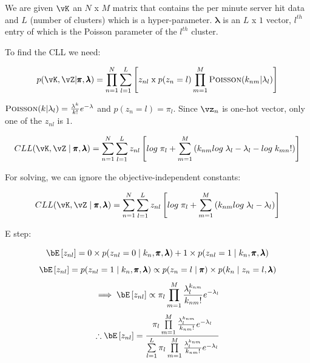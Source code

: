 \documentclass[a4paper,12pt]{article}
\begin{document}
\begin{mlsolution}

We are given $\vK$ an $N$ x $M$ matrix that contains the per minute server hit data and $L$ (number of clusters) which is a hyper-parameter. $\pmb{\lambda}$ is an $L$ x $1$ vector, $l^{th}$ entry of which is the Poisson parameter of the $l^{th}$ cluster.

To find the CLL we need:

\begin{equation*}
    p(\vK, \vZ | \pmb{\pi}, \pmb{\lambda}) = \prod\limits_{n=1}^N\sum\limits_{l=1}^L\bs{z_{nl}\;\text{x}\; p(z_n = l)\prod\limits_{m=1}^M\textsc{Poisson}(k_{nm}|\lambda_l)}
\end{equation*}

$\textsc{Poisson}(k|\lambda_l) = \frac{\lambda^k}{k!}e^{-\lambda}$ and $p(z_n = l) = \pi_l$. Since $\vz_n$ is one-hot vector, only one of the $z_{nl}$ is $1$.

\begin{equation*}
    CLL(\vK, \vZ \;|\;\pmb{\pi}, \pmb{\lambda}) = \sum\limits_{n=1}^N\sum\limits_{l=1}^Lz_{nl}\bs{log\;\pi_l + \sum\limits_{m=1}^M\br{k_{nm}log\;\lambda_l - \lambda_l - log\; k_{mn}!}}
\end{equation*}

For solving, we can ignore the objective-independent constants:

\begin{equation}
    CLL(\vK, \vZ \;|\;\pmb{\pi}, \pmb{\lambda}) = \sum\limits_{n=1}^N\sum\limits_{l=1}^Lz_{nl}\bs{log\;\pi_l + \sum\limits_{m=1}^M\br{k_{nm}log\;\lambda_l - \lambda_l}}
\end{equation}

E step:

\begin{equation*}
    \bE\bs{z_{nl}} = 0 \times p(z_{nl}=0\;|\; k_n, \pmb{\pi}, \pmb{\lambda}) + 1 \times p(z_{nl}=1\;|\; k_n, \pmb{\pi}, \pmb{\lambda})
\end{equation*}
\begin{equation*}
    \bE\bs{z_{nl}} = p(z_{nl}=1\;|\; k_n, \pmb{\pi}, \pmb{\lambda}) \propto p(z_n = l\;|\;\pmb{\pi}) \times p(k_n \;|\; z_n=l, \pmb{\lambda})
\end{equation*}
\begin{equation*}
    \implies \bE\bs{z_{nl}} \propto \pi_l \prod\limits_{m=1}^M\frac{\lambda_l^{k_{nm}}}{k_{nm}!}e^{-\lambda_l}
\end{equation*}
\begin{equation}
    \therefore \bE\bs{z_{nl}} = \frac{\pi_l \prod\limits_{m=1}^M\frac{\lambda_l^{k_{nm}}}{k_{nm}!}e^{-\lambda_l}}{\sum\limits_{l=1}^L \pi_l \prod\limits_{m=1}^M\frac{\lambda_l^{k_{nm}}}{k_{nm}!}e^{-\lambda_l}}
\end{equation}


\end{mlsolution}
\end{document}
